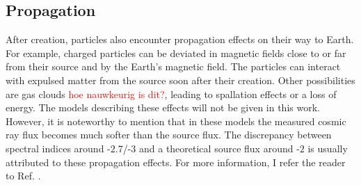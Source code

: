 \subsection{Propagation}
\label{subsec:propagation}
After creation, particles also encounter propagation effects on their way to Earth. For example, charged particles can be deviated in magnetic fields close to or far from their source and by the Earth's magnetic field. The particles can interact with expulsed matter from the source soon after their creation. Other possibilities are gas clouds \textcolor{red}{hoe nauwkeurig is dit?}, leading to spallation effects or a loss of energy. The models describing these effects will not be given in this work. However, it is noteworthy to mention that in these models the measured cosmic ray flux becomes much softer than the source flux. The discrepancy between spectral indices around -$2.7$/-$3$ and a theoretical source flux around -$2$ is usually attributed to these propagation effects. For more information, I refer the reader to Ref. \cite{Gaisser:2016uoy}.


